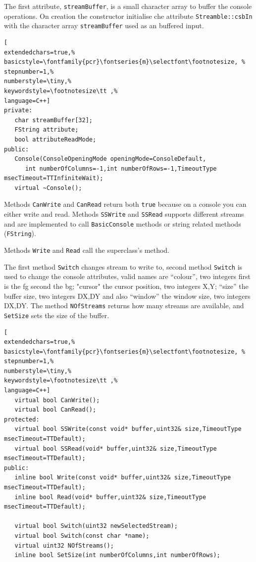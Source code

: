 The first attribute, \texttt{streamBuffer}, is a small character array to buffer the console operations. On creation the constructor initialise che attribute \texttt{Streamble::csbIn} with the character array \texttt{streamBuffer} used as an buffered input.
\begin{lstlisting}[
extendedchars=true,%
basicstyle=\fontfamily{pcr}\fontseries{m}\selectfont\footnotesize, %
stepnumber=1,%
numberstyle=\tiny,%
keywordstyle=\footnotesize\tt ,%
language=C++]
private:
   char streamBuffer[32];
   FString attribute;
   bool attributeReadMode;
public:
   Console(ConsoleOpeningMode openingMode=ConsoleDefault,
      int numberOfColumns=-1,int numberOfRows=-1,TimeoutType msecTimeout=TTInfiniteWait);
   virtual ~Console();
\end{lstlisting}

Methods \texttt{CanWrite} and \texttt{CanRead} return both \texttt{true} because on a console you can either write and read. Methods \texttt{SSWrite} and \texttt{SSRead} supports different streams and are implemented to call \texttt{BasicConsole} methods or string related methods (\texttt{FString}).

Methods \texttt{Write} and \texttt{Read} call the superclass's method.

The first method \texttt{Switch} changes stream to write to, second method \texttt{Switch} is used to change the console attributes, valid names are ``colour'', two integers first is the fg second the bg; "cursor" the cursor position,  two integers X,Y; ``size'' the buffer size, two integers DX,DY and also ``window'' the window size, two integers DX,DY.
The method \texttt{NOfStreams} returns how many streams are available, and \texttt{SetSize} sets the size of the buffer.
\begin{lstlisting}[
extendedchars=true,%
basicstyle=\fontfamily{pcr}\fontseries{m}\selectfont\footnotesize, %
stepnumber=1,%
numberstyle=\tiny,%
keywordstyle=\footnotesize\tt ,%
language=C++]
   virtual bool CanWrite();
   virtual bool CanRead();
protected:
   virtual bool SSWrite(const void* buffer,uint32& size,TimeoutType msecTimeout=TTDefault);
   virtual bool SSRead(void* buffer,uint32& size,TimeoutType msecTimeout=TTDefault);
public:
   inline bool Write(const void* buffer,uint32& size,TimeoutType msecTimeout=TTDefault);
   inline bool Read(void* buffer,uint32& size,TimeoutType msecTimeout=TTDefault);

   virtual bool Switch(uint32 newSelectedStream);
   virtual bool Switch(const char *name);
   virtual uint32 NOfStreams();
   inline bool SetSize(int numberOfColumns,int numberOfRows);
\end{lstlisting}



